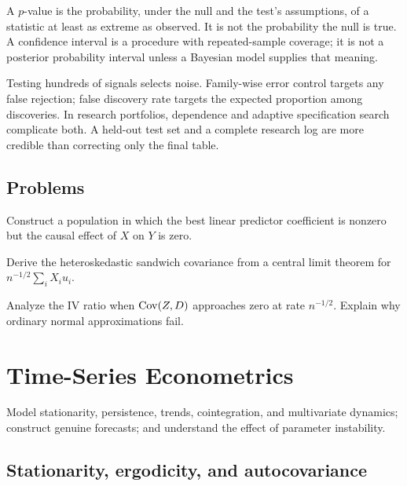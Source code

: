 A $p$-value is the probability, under the null and the test's assumptions, of a
statistic at least as extreme as observed. It is not the probability the null is
true. A confidence interval is a procedure with repeated-sample coverage; it is not
a posterior probability interval unless a Bayesian model supplies that meaning.

Testing hundreds of signals selects noise. Family-wise error control targets any
false rejection; false discovery rate targets the expected proportion among
discoveries. In research portfolios, dependence and adaptive specification search
complicate both. A held-out test set and a complete research log are more credible
than correcting only the final table.

\section{Problems}

\begin{exercise}
Construct a population in which the best linear predictor coefficient is nonzero
but the causal effect of $X$ on $Y$ is zero.
\end{exercise}
\begin{exercise}
Derive the heteroskedastic sandwich covariance from a central limit theorem for
$n^{-1/2}\sum_iX_iu_i$.
\end{exercise}
\begin{exercise}
Analyze the IV ratio when $\operatorname{Cov}(Z,D)$ approaches zero at rate $n^{-1/2}$. Explain
why ordinary normal approximations fail.
\end{exercise}


\chapter{Time-Series Econometrics}

\begin{objectives}
Model stationarity, persistence, trends, cointegration, and multivariate dynamics;
construct genuine forecasts; and understand the effect of parameter instability.
\end{objectives}

\section{Stationarity, ergodicity, and autocovariance}

